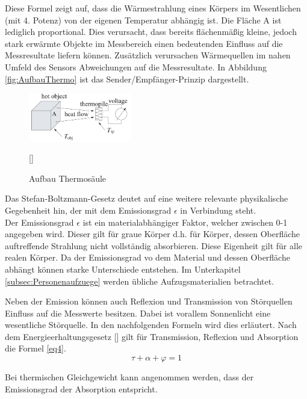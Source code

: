 Diese Formel zeigt auf, dass die Wärmestrahlung eines Körpers im Wesentlichen (mit 4. Potenz) von der eigenen Temperatur abhängig ist. 
Die Fläche A ist lediglich proportional. Dies verursacht, dass bereits flächenmäßig kleine, jedoch stark erwärmte Objekte im Messbereich einen bedeutenden Einfluss auf die Messresultate liefern können. Zusätzlich verursachen Wärmequellen im nahen Umfeld des Sensors Abweichungen auf die Messresultate. In Abbildung \ref{fig:AufbauThermo} ist das Sender/Empfänger-Prinzip dargestellt.

\begin{figure}[H]
	\centering
	\includegraphics[width=0.4\textwidth]
	{fig/seebeck2.PNG}
	\caption[Aufbau Thermosäule]{Aufbau Thermosäule} [\protect\cite{seebeck}]
	\label{fig:thermosäule}
\end{figure}


Das Stefan-Boltzmann-Gesetz deutet auf eine weitere relevante physikalische Gegebenheit hin, der mit dem Emissionsgrad $\epsilon$  in Verbindung steht.\\
 Der Emissionsgrad $\epsilon$ ist ein materialabhängiger Faktor, welcher zwischen 0-1  angegeben wird. Dieser gilt für graue Körper d.h. für Körper, dessen Oberfläche auftreffende Strahlung nicht vollständig absorbieren. Diese Eigenheit gilt für alle realen Körper. Da der Emissionsgrad vo dem Material und dessen Oberfläche abhängt können starke Unterschiede entstehen. Im Unterkapitel \ref{subsec:Personenaufzuege} werden übliche Aufzugsmaterialien betrachtet.

Neben der Emission können auch Reflexion und Transmission von Störquellen Einfluss auf die Messwerte besitzen. Dabei ist vorallem Sonnenlicht eine wesentliche Störquelle. In den nachfolgenden Formeln wird dies erläutert. Nach dem Energieerhaltungsgesetz [\protect\cite{Thermoformeln}] gilt für Transmission, Reflexion und Absorption die Formel \ref{eq4}.
\begin{equation}
\label{eq4}
\tau  + \alpha + \varphi  = 1
\end{equation}

Bei thermischen Gleichgewicht kann angenommen werden, dass der Emissionsgrad der Absorption entspricht.

